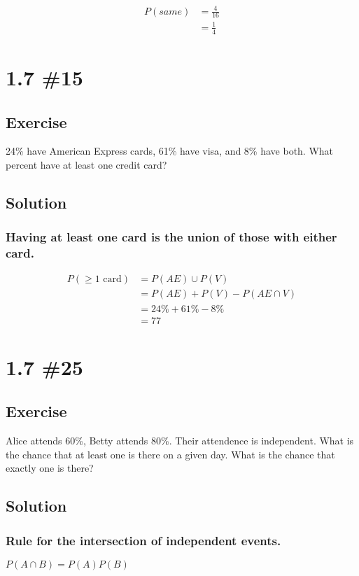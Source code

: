 \documentclass[12pt]{article}
\begin{document}
\begin{align*}
P(same) & = \frac{4}{16} \\
        & = \frac{1}{4}  
\end{align*}

\section{1.7 \#15} 
\subsection{Exercise} 
24\% have American Express cards, 61\% have visa, and 8\% have both. What percent have at least one credit card?

\subsection{Solution}
\subsubsection{Having at least one card is the union of those with either card.}
\begin{align*}
P(\geq \text{1 card}) & = P(AE) \cup P(V) \\
               & = P(AE) + P(V) - P(AE \cap V) \\
               & = 24\% + 61\% - 8\% \\
               & = 77%
\end{align*}

\section{1.7 \#25} 
\subsection{Exercise}
Alice attends 60\%, Betty attends 80\%. Their attendence is independent. What is the chance that at least one is there on 
a given day.
What is the chance that exactly one is there?

\subsection{Solution}
\subsubsection{Rule for the intersection of independent events.}
$P(A \cap B) = P(A)P(B)$
\end{document}
